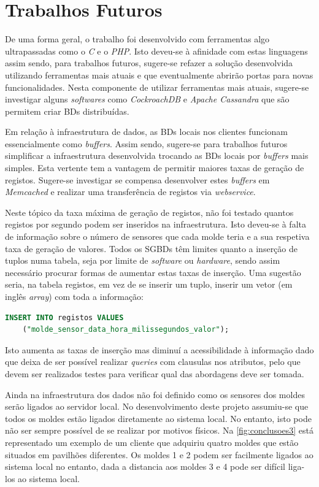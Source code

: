 \documentclass[11pt,twoside,a4paper]{report}
\begin{document}
\section{Trabalhos Futuros}
De uma forma geral, o trabalho foi desenvolvido com ferramentas algo ultrapassadas como o \textit{C} e o \textit{PHP}. Isto deveu-se à afinidade com estas linguagens assim sendo, para trabalhos futuros, sugere-se refazer a solução desenvolvida utilizando ferramentas mais atuais e que eventualmente abrirão portas para novas funcionalidades. Nesta componente de utilizar ferramentas mais atuais, sugere-se investigar alguns \textit{softwares} como \textit{CockroachDB} e \textit{Apache Cassandra} que são  permitem criar BDs distribuídas.\par 
Em relação à infraestrutura de dados, as BDs locais nos clientes funcionam essencialmente como \textit{buffers}. Assim sendo, sugere-se para trabalhos futuros simplificar a infraestrutura desenvolvida trocando as BDs locais por \textit{buffers} mais simples. Esta vertente tem a vantagem de permitir maiores taxas de geração de registos. Sugere-se investigar se compensa desenvolver estes \textit{buffers} em \textit{Memcached} e realizar uma transferência de registos via \textit{webservice}.\par
Neste tópico da taxa máxima de geração de registos, não foi testado quantos registos por segundo podem ser inseridos na infraestrutura. Isto deveu-se à falta de informação sobre o número de sensores que cada molde teria e a sua respetiva taxa de geração de valores. Todos os SGBDs têm limites quanto a inserção de tuplos numa tabela, seja por limite de \textit{software} ou \textit{hardware}, sendo assim necessário procurar formas de aumentar estas taxas de inserção. Uma sugestão seria, na tabela registos, em vez de se inserir um tuplo, inserir um vetor (em inglês \textit{array}) com toda a informação:
\begin{lstlisting}[language = SQL]
	INSERT INTO registos VALUES
	("molde_sensor_data_hora_milissegundos_valor");
\end{lstlisting}
Isto aumenta as taxas de inserção mas diminuí a acessibilidade à informação dado que deixa de ser possível realizar \textit{queries} com clausulas nos atributos, pelo que devem ser realizados testes para verificar qual das abordagens deve ser tomada.\par
Ainda na infraestrutura dos dados não foi definido como os sensores dos moldes serão ligados ao servidor local. No desenvolvimento deste projeto assumiu-se que todos os moldes estão ligados diretamente ao sistema local. No entanto, isto pode não ser sempre possível de se realizar por motivos físicos. Na \autoref{fig:conclusoes3} está representado um exemplo de um cliente que adquiriu quatro moldes que estão situados em pavilhões diferentes. Os moldes 1 e 2 podem ser facilmente ligados ao sistema local no entanto, dada a distancia aos moldes 3 e 4 pode ser difícil liga-los ao sistema local.\par 
\end{document}
